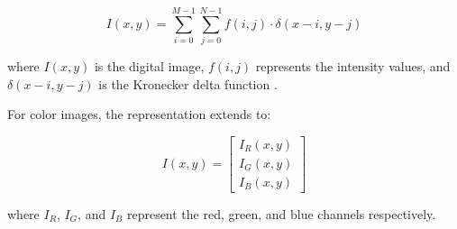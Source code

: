 \begin{equation}
  I(x,y) = \sum_{i=0}^{M-1} \sum_{j=0}^{N-1} f(i,j) \cdot \delta(x-i, y-j)
\end{equation}

where $I(x,y)$ is the digital image, $f(i,j)$ represents the
intensity values, and $\delta(x-i, y-j)$ is the Kronecker delta
function \cite{DuarteBaraniuk2012}.

For color images, the representation extends to:

\begin{equation}
  I(x,y) =
  \begin{bmatrix}
    I_R(x,y) \\
    I_G(x,y) \\
    I_B(x,y)
  \end{bmatrix}
\end{equation}

where $I_R$, $I_G$, and $I_B$ represent the red, green, and blue
channels respectively.

